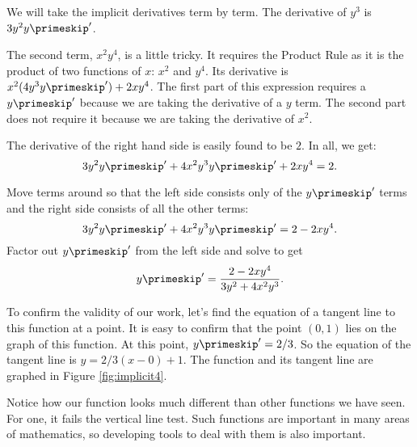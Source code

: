 {We will take the implicit derivatives term by term. The derivative of $y^3$ is $3y^2y\primeskip'$.  

The second term, $x^2y^4$, is a little tricky.  It requires the Product Rule as it is the product of two functions of $x$: $x^2$ and $y^4$.  Its derivative is $x^2(4y^3y\primeskip') + 2xy^4$.  The first part of this expression requires a $y\primeskip'$ because we are taking the derivative of a $y$ term.  The second part does not require it because we are taking the derivative of $x^2$.  

The derivative of the right hand side is easily found to be $2$. In all, we get:
$$3y^2y\primeskip' + 4x^2y^3y\primeskip' + 2xy^4 = 2.$$

Move terms around so that the left side consists only of the $y\primeskip'$ terms and the right side consists of all the other terms:
$$3y^2y\primeskip' + 4x^2y^3y\primeskip' = 2-2xy^4.$$
Factor out $y\primeskip'$ from the left side and solve to get
$$y\primeskip' = \frac{2-2xy^4}{3y^2+4x^2y^3}.$$

To confirm the validity of our work, let's find the equation of a tangent line to this function at a point. It is easy to confirm that the point $(0,1)$ lies on the graph of this function. At this point, $y\primeskip' = 2/3$. So the equation of the tangent line is $y = 2/3(x-0)+1$. The function and its tangent line are graphed in Figure \ref{fig:implicit4}.


Notice how our function looks much different than other functions we have seen. For one, it fails the vertical line test. Such functions are important in many areas of mathematics, so developing tools to deal with them is also important.
}\\

